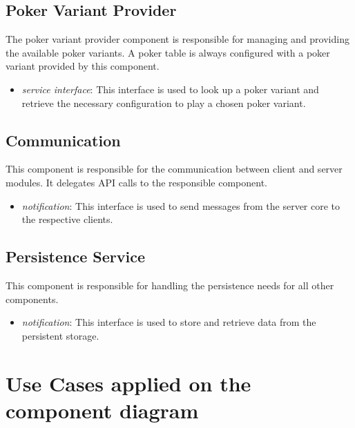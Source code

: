 \documentclass[a4paper,11pt]{report}
\begin{document}
\subsection{Poker Variant Provider}
The poker variant provider component is responsible for managing and providing the available poker variants. A  poker table is always configured with a poker variant provided by this component.
\begin{itemize}
\item \emph{service interface}: This interface is used to look up a poker variant and retrieve the necessary configuration to play a chosen poker variant.
\end{itemize}

\subsection{Communication}
This component is responsible for the communication between client and server modules. It delegates API calls to the responsible component.
\begin{itemize}
\item \emph{notification}: This interface is used to send messages from the server core to the respective clients.
\end{itemize}

\subsection{Persistence Service}
This component is responsible for handling the persistence needs for all other components.
\begin{itemize}
\item \emph{notification}: This interface is used to store and retrieve data from the persistent storage.
\end{itemize}

\section{Use Cases applied on the component diagram}
\end{document}
